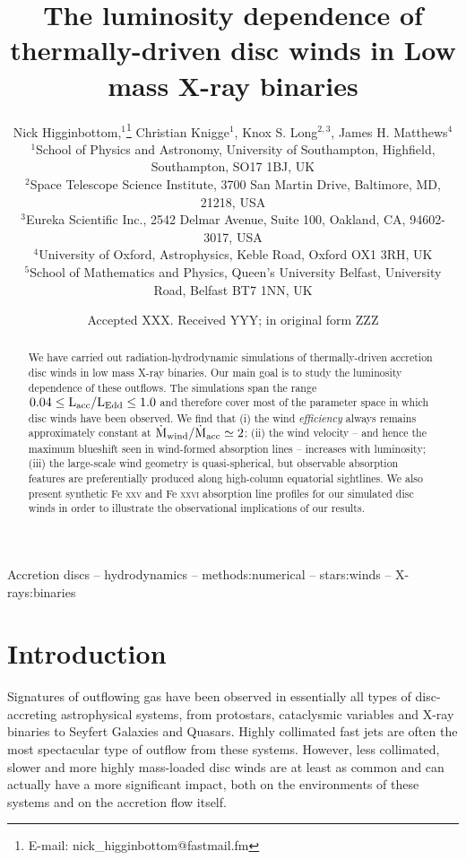 \documentclass[a4paper,fleqn,usenatbib]{mnras}
\title[The luminosity dependence of disc winds in LMXBs]{The luminosity dependence of thermally-driven disc winds in Low mass X-ray binaries}
\author[N. Higginbottom et. al]
{Nick Higginbottom,$^{1}$\thanks{E-mail: nick\_higginbottom@fastmail.fm}
Christian Knigge$^{1}$, Knox S. Long$^{2,3}$, 
James H. Matthews$^{4}$ \newauthor{and
Edward J. Parkinson$^{1}$.}
\\
$^{1}$School of Physics and Astronomy, University of Southampton, Highfield, Southampton, SO17 1BJ, UK\\
$^{2}$Space Telescope Science Institute, 3700 San Martin Drive, Baltimore, MD, 21218, USA\\
$^{3}$Eureka Scientific Inc., 2542 Delmar Avenue, Suite 100, Oakland, CA, 94602-3017, USA\\
$^{4}$University of Oxford, Astrophysics, Keble Road, Oxford OX1 3RH, UK\\
$^{5}$School of Mathematics and Physics, Queen's University Belfast, University Road, Belfast 
BT7 1NN, UK\\
}
\date{Accepted XXX. Received YYY; in original form ZZZ}
\begin{document}
\label{firstpage}
\pagerange{\pageref{firstpage}--\pageref{lastpage}}
\maketitle

\begin{abstract}

  We have carried out radiation-hydrodynamic simulations of
  thermally-driven accretion disc winds in low mass X-ray binaries. Our main
  goal is to study the luminosity dependence of these outflows. The 
  simulations span the range 
  $\rm{0.04 \leq L_{acc}/L_{Edd} \leq 1.0}$ and therefore cover most
  of the parameter space in which disc winds have been observed. We
  find that (i) the wind {\em
  efficiency} always remains approximately
  constant at $\rm{\dot{M}_{wind}/\dot{M}_{acc} \simeq 2}$;
  (ii) the wind velocity -- and hence the maximum blueshift seen
  in wind-formed absorption lines -- increases with luminosity;
  (iii) the large-scale wind geometry is quasi-spherical, but 
  observable absorption features are preferentially produced along
  high-column equatorial sightlines.  We also present synthetic Fe \textsc{xxv}
  and Fe \textsc{xxvi} absorption line profiles for our simulated disc winds in order
  to illustrate the observational implications of our results.

\end{abstract}

\begin{keywords}
Accretion discs -- hydrodynamics -- methods:numerical -- stars:winds -- X-rays:binaries
\end{keywords}



\section{Introduction}
Signatures of outflowing gas have been observed in essentially all
types of disc-accreting astrophysical systems, from protostars,
cataclysmic variables and X-ray binaries to Seyfert Galaxies and
Quasars. Highly collimated fast jets are often the most spectacular
type of outflow from these systems. However, less collimated, slower
and more highly mass-loaded disc winds are at least as common and can 
actually have a more significant impact, both on the environments of
these systems and on the accretion flow itself. 
 
\end{document}
